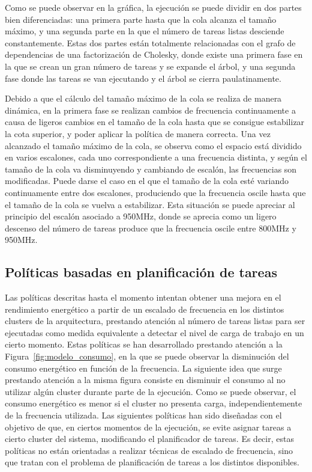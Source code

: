 Como se puede observar en la gráfica, la ejecución se puede dividir en dos
partes bien diferenciadas: una primera parte hasta que la cola alcanza el
tamaño máximo, y una segunda parte en la que el número de tareas listas
desciende constantemente. Estas dos partes están totalmente relacionadas
con el grafo de dependencias de una factorización de Cholesky, donde existe
una primera fase en la que se crean un gran número de tareas y se expande
el árbol, y una segunda fase donde las tareas se van ejecutando y el árbol
se cierra paulatinamente.

Debido a que el cálculo del tamaño máximo de la cola se realiza de manera
dinámica, en la primera fase se realizan cambios de frecuencia
continuamente a causa de ligeros cambios en el tamaño de la cola hasta que
se consigue estabilizar la cota superior, y poder aplicar la política de
manera correcta. Una vez alcanzado el tamaño máximo de la cola, se observa
como el espacio está dividido en varios escalones, cada uno correspondiente
a una frecuencia distinta, y según el tamaño de la cola va disminuyendo y
cambiando de escalón, las frecuencias son modificadas. Puede darse el caso
en el que el tamaño de la cola esté variando continuamente entre dos
escalones, produciendo que la frecuencia oscile hasta que el tamaño de la
cola se vuelva a estabilizar. Esta situación se puede apreciar al principio
del escalón asociado a 950MHz, donde se aprecia como un ligero descenso del
número de tareas produce que la frecuencia oscile entre 800MHz y 950MHz.


\subsection[Políticas basadas en planificación de tareas (P4, P5 y
P6)]{Políticas basadas en planificación de tareas}
Las políticas descritas hasta el momento intentan obtener una mejora en el
rendimiento energético a partir de un escalado de frecuencia en los
distintos clusters de la arquitectura, prestando atención al número de
tareas listas para ser ejecutadas como medida equivalente a detectar el
nivel de carga de trabajo en un cierto momento. Estas políticas se han
desarrollado prestando atención a la Figura~\ref{fig:modelo_consumo}, en la
que se puede observar la disminución del consumo energético en función de
la frecuencia. La siguiente idea que surge prestando atención a la misma
figura consiste en disminuir el consumo al no utilizar algún cluster
durante parte de la ejecución. Como se puede observar, el consumo
energético es menor si el cluster no presenta carga, independientemente de
la frecuencia utilizada. Las siguientes políticas han sido diseñadas con el
objetivo de que, en ciertos momentos de la ejecución, se evite asignar
tareas a cierto cluster del sistema, modificando el planificador de tareas.
Es decir, estas políticas no están orientadas a realizar técnicas de
escalado de frecuencia, sino que tratan con el problema de planificación de
tareas a los distintos \wts disponibles.

